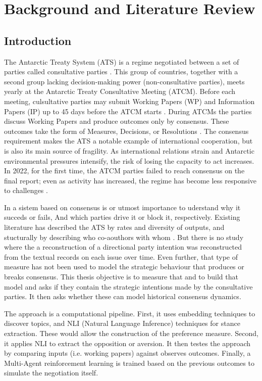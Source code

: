 \chapter{Background and Literature Review}
\label{ch:litreview}

\section{Introduction}
\label{sec:lr-intro}
The Antarctic Treaty System (ATS) is a regime negotiated between a set of parties
called consultative parties \textcite{ATS2023RoP}. This group of countries, together with
a second group lacking decision-making power (non-consultative parties), meets
 yearly at the Antarctic Treaty Consultative Meeting (ATCM). Before each meeting,
culsultative parties may submit Working Papers (WP) and Information Papers (IP) up
to 45 days before the ATCM starts \textcite{ATS2023RoP}.
During ATCMs the parties discuss Working Papers and produce outcomes only by consensus.
These outcomes take the form of Measures, Decisions, or Resolutions \textcite{ATCM1995dec1}.
The consensus requirement makes the ATS a notable example of international cooperation,
 but is also its main source of fragility.
As international relations strain and Antarctic environmental pressures intensify,
the risk of losing the capacity to act increases. In 2022, for the first time, the
ATCM parties failed to reach consensus on the final report; even as activity has
increased, the regime has become less responsive to challenges \textcite{Gardiner2025}.


In a sistem based on consensus is or utmost importance to uderstand why it succeds or fails,
And which parties drive it or block it, respectively. Existing literature has described the ATS
by rates and diversity of outputs, and stucturally by describing who co-aouthors with whom 
\textcite{Botelho_CoalitionDynamics,Kumar_ConsistentPatterns}. But there is no study where the
a reconstruction of a directional party intention was reconstructed from the textual records
 on each issue over time.
 Even further, that type of measure has not been used to model the strategic behaviour that 
 produces or breaks consensus. This thesis objective is to measure that and to build that 
 model and asks if they contain the strategic intentions made by the consultative parties.
 It then asks whether these can model historical consensus dynamics.

The approach is a computational pipeline. First, it uses embedding techniques to discover topics, 
and NLI (Natural Language Inference) techniques for stance extraction. These would allow
the construction of the preference measure. Second, it applies NLI to extract the opposition 
or aversion. It then testes the approach by comparing inputs (i.e. working papers) against
 observes outcomes. Finally, a Multi-Agent reinforcement learning is trained based on the
  previous outcomes to simulate the negotiation itself. 

